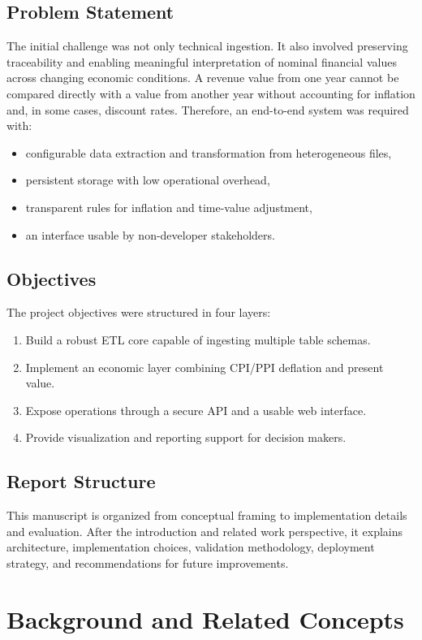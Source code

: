\documentclass[12pt,a4paper]{report}
\begin{document}
\section{Problem Statement}
The initial challenge was not only technical ingestion. It also involved preserving traceability and enabling meaningful interpretation of nominal financial values across changing economic conditions. A revenue value from one year cannot be compared directly with a value from another year without accounting for inflation and, in some cases, discount rates. Therefore, an end-to-end system was required with:
\begin{itemize}[leftmargin=1.5em]
  \item configurable data extraction and transformation from heterogeneous files,
  \item persistent storage with low operational overhead,
  \item transparent rules for inflation and time-value adjustment,
  \item an interface usable by non-developer stakeholders.
\end{itemize}

\section{Objectives}
The project objectives were structured in four layers:
\begin{enumerate}[leftmargin=1.5em]
  \item Build a robust ETL core capable of ingesting multiple table schemas.
  \item Implement an economic layer combining CPI/PPI deflation and present value.
  \item Expose operations through a secure API and a usable web interface.
  \item Provide visualization and reporting support for decision makers.
\end{enumerate}

\section{Report Structure}
This manuscript is organized from conceptual framing to implementation details and evaluation. After the introduction and related work perspective, it explains architecture, implementation choices, validation methodology, deployment strategy, and recommendations for future improvements.

\chapter{Background and Related Concepts}
\end{document}
